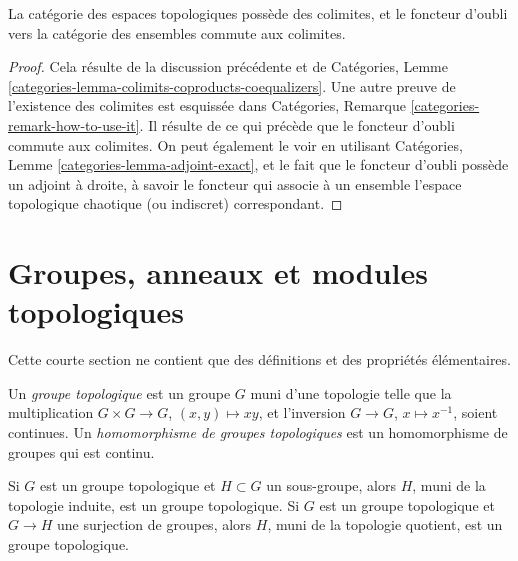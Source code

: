 \begin{lemma}
\label{lemma-colimits}
La catégorie des espaces topologiques possède des colimites, et le foncteur
d'oubli vers la catégorie des ensembles commute aux colimites.
\end{lemma}

\begin{proof}
Cela résulte de la discussion précédente et de Catégories, Lemme
\ref{categories-lemma-colimits-coproducts-coequalizers}. Une autre preuve de
l'existence des colimites est esquissée dans Catégories, Remarque
\ref{categories-remark-how-to-use-it}. Il résulte de ce qui précède que le
foncteur d'oubli commute aux colimites. On peut également le voir en utilisant
Catégories, Lemme \ref{categories-lemma-adjoint-exact}, et le fait que le
foncteur d'oubli possède un adjoint à droite, à savoir le foncteur qui associe
à un ensemble l'espace topologique chaotique (ou indiscret) correspondant.
\end{proof}





\section{Groupes, anneaux et modules topologiques}
\label{section-topological-groups}

\noindent
Cette courte section ne contient que des définitions et des propriétés
élémentaires.

\begin{definition}
\label{definition-topological-group}
Un {\it groupe topologique} est un groupe $G$ muni d'une topologie telle que
la multiplication $G \times G \to G$, $(x, y) \mapsto xy$, et l'inversion
$G \to G$, $x \mapsto x^{-1}$, soient continues.
Un {\it homomorphisme de groupes topologiques} est un homomorphisme de groupes
qui est continu.
\end{definition}

\noindent
Si $G$ est un groupe topologique et $H \subset G$ un sous-groupe, alors $H$,
muni de la topologie induite, est un groupe topologique. Si $G$ est un groupe
topologique et $G \to H$ une surjection de groupes, alors $H$, muni de la
topologie quotient, est un groupe topologique.

